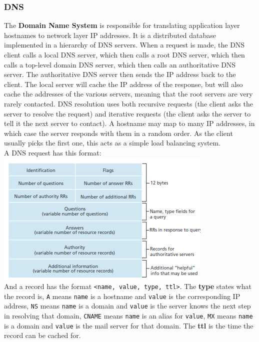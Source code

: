 \subsubsection{DNS}
The \textbf{Domain Name System} is responsible for translating application layer hostnames to network layer IP addresses. It is a distributed database implemented in a hierarchy of DNS servers. When a request is made, the DNS client calls a local DNS server, which then calls a root DNS server, which then calls a top-level domain DNS server, which then calls an authoritative DNS server. The authoritative DNS server then sends the IP address back to the client. The local server will cache the IP address of the response, but will also cache the addresses of the various servers, meaning that the root servers are very rarely contacted. DNS resolution uses both recursive requests (the client asks the server to resolve the request) and iterative requests (the client asks the server to tell it the next server to contact). A hostname may map to many IP addresses, in which case the server responds with them in a random order. As the client usually picks the first one, this acts as a simple load balancing system.\\
A DNS request has this format:
\includegraphics[width=\linewidth]{../images/w3n7dnsMessage.png}\\
And a record has the format \verb|<name, value, type, ttl>|. The \textbf{type} states what the record is, \verb|A| means \verb|name| is a hostname and \verb|value| is the corresponding IP address, \verb|NS| means \verb|name| is a domain and \verb|value| is the server knows the next step in resolving that domain, \verb|CNAME| means \verb|name| is an alias for \verb|value|, \verb|MX| means \verb|name| is a domain and \verb|value| is the mail server for that domain. The \textbf{ttl} is the time the record can be cached for.\\

